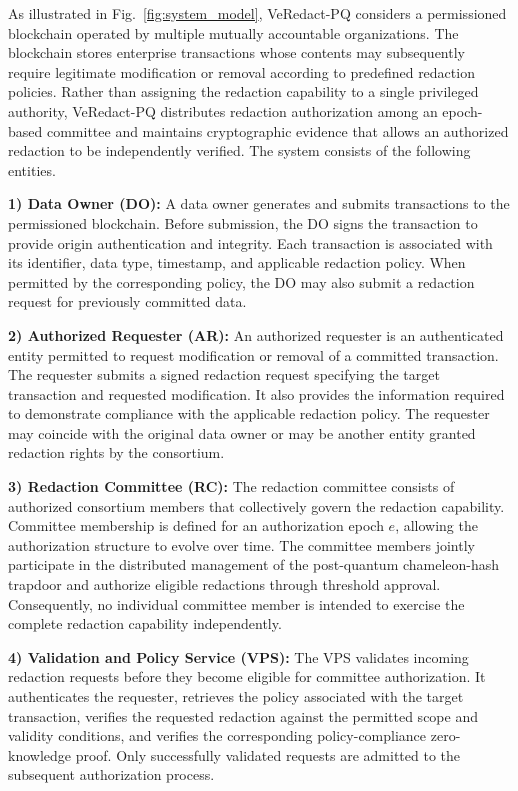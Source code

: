 \documentclass[lettersize,journal]{IEEEtran}
\begin{document}
    As illustrated in Fig.~\ref{fig:system_model}, VeRedact-PQ considers a permissioned
    blockchain operated by multiple mutually accountable organizations.
    The blockchain stores enterprise transactions whose contents may
    subsequently require legitimate modification or removal according to
    predefined redaction policies. Rather than assigning the redaction
    capability to a single privileged authority, VeRedact-PQ distributes
    redaction authorization among an epoch-based committee and maintains
    cryptographic evidence that allows an authorized redaction to be
    independently verified. The system consists of the following entities.
    
    \textbf{1) Data Owner (DO):}
    A data owner generates and submits transactions to the permissioned
    blockchain. Before submission, the DO signs the transaction to provide
    origin authentication and integrity. Each transaction is associated
    with its identifier, data type, timestamp, and applicable redaction
    policy. When permitted by the corresponding policy, the DO may also
    submit a redaction request for previously committed data.
    
    \textbf{2) Authorized Requester (AR):}
    An authorized requester is an authenticated entity permitted to request
    modification or removal of a committed transaction. The requester
    submits a signed redaction request specifying the target transaction
    and requested modification. It also provides the information required
    to demonstrate compliance with the applicable redaction policy. The
    requester may coincide with the original data owner or may be another
    entity granted redaction rights by the consortium.
    
    \textbf{3) Redaction Committee (RC):}
    The redaction committee consists of authorized consortium members that
    collectively govern the redaction capability. Committee membership is
    defined for an authorization epoch $e$, allowing the authorization
    structure to evolve over time. The committee members jointly participate
    in the distributed management of the post-quantum chameleon-hash
    trapdoor and authorize eligible redactions through threshold approval.
    Consequently, no individual committee member is intended to exercise
    the complete redaction capability independently.
    
    \textbf{4) Validation and Policy Service (VPS):}
    The VPS validates incoming redaction requests before they become
    eligible for committee authorization. It authenticates the requester,
    retrieves the policy associated with the target transaction, verifies
    the requested redaction against the permitted scope and validity
    conditions, and verifies the corresponding policy-compliance
    zero-knowledge proof. Only successfully validated requests are admitted
    to the subsequent authorization process.
    
\end{document}
